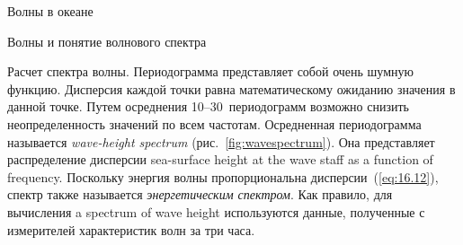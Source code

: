 \begin{chapter}{Волны в океане}
\begin{section}{Волны и понятие волнового спектра}
\begin{paragraph}{Расчет спектра волны.}
Периодограмма представляет собой очень шумную функцию. Дисперсия каждой
точки равна математическому ожиданию значения в данной точке. Путем осреднения
10--30~периодограмм возможно снизить неопределенность значений по всем
частотам. Осредненная периодограмма называется 
\emph{wave-height spectrum} 
(рис.~\ref{fig:wavespectrum}). 
Она представляет распределение дисперсии 
sea-surface height at the wave staff as a function of
frequency. Поскольку энергия волны пропорциональна дисперсии~(\ref{eq:16.12}),
спектр также называется 
\emph{энергетическим спектром}. 
Как правило, для вычисления a spectrum of wave height используются
данные, полученные с измерителей характеристик волн за три часа.
%
\end{paragraph}


\end{section}
\end{chapter}
